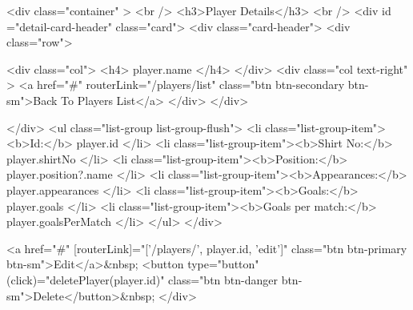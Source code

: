 <div class="container"  >
  <br />
  <h3>Player Details</h3>
  <br />
  <div   id ="detail-card-header" class="card">
    <div   class="card-header">
      <div class="row">

    

	  <div class="col">
          <h4>{{ player.name }}</h4>
        </div>
        <div     class="col text-right" >
          <a href="#" routerLink="/players/list" class="btn btn-secondary btn-sm">Back To Players List</a>
        </div>
      </div>
     
	



	  </div>
    <ul class="list-group list-group-flush">
      <li class="list-group-item"><b>Id:</b> {{ player.id }}</li>
      <li class="list-group-item"><b>Shirt No:</b> {{ player.shirtNo }}</li>
      <li class="list-group-item"><b>Position:</b> {{ player.position?.name }}</li>
      <li class="list-group-item"><b>Appearances:</b> {{ player.appearances }}</li>
      <li class="list-group-item"><b>Goals:</b> {{ player.goals }}</li>
      <li class="list-group-item"><b>Goals per match:</b> {{ player.goalsPerMatch }}</li>
    </ul>
  </div>
  
  <a href="#" [routerLink]="['/players/', player.id, 'edit']" class="btn btn-primary btn-sm">Edit</a>&nbsp;
        <button type="button" (click)="deletePlayer(player.id)" class="btn btn-danger btn-sm">Delete</button>&nbsp;
</div>
